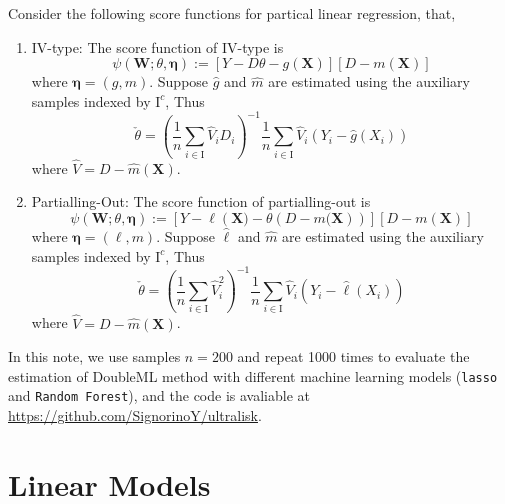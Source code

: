 \documentclass[en,12pt,mtpro2]{elegantpaper}
\begin{document}
Consider the following score functions for partical linear regression, that,
\begin{enumerate}
    \item IV-type: The score function of IV-type is
          \begin{equation}
              \psi\left(\mathbf{W};\theta,\boldsymbol{\eta}\right):=\left[Y-D\theta-g(\mathbf{X})\right]\left[D-m(\mathbf{X})\right]
          \end{equation}
          where $\boldsymbol{\eta}=(g,m)$. Suppose $\hat{g}$ and $\hat{m}$ are estimated using the auxiliary samples indexed by $\mathrm{I}^{c}$, Thus
          \begin{equation}
              \check{\theta}=\left(\frac{1}{n}\sum_{i\in\mathrm{I}}\widehat{V}_{i}D_{i}\right)^{-1}\frac{1}{n}\sum_{i\in\mathrm{I}}\hat{V}_{i}\left(Y_{i}-\hat{g}\left(X_{i}\right)\right)
          \end{equation}
          where $\hat{V}=D-\hat{m}(\mathbf{X})$.
    \item Partialling-Out: The score function of partialling-out is
          \begin{equation}
              \psi\left(\mathbf{W};\theta,\boldsymbol{\eta}\right):=\left[Y-\ell\left(\mathbf{X})-\theta\left(D-m(\mathbf{X}\right)\right)\right]\left[D-m(\mathbf{X})\right]
          \end{equation}
          where $\boldsymbol{\eta}=(\ell,m)$. Suppose $\hat{\ell}$ and $\hat{m}$ are estimated using the auxiliary samples indexed by $\mathrm{I}^{c}$, Thus
          \begin{equation}
              \check{\theta}=\left(\frac{1}{n}\sum_{i\in\mathrm{I}}\widehat{V}_{i}^{2}\right)^{-1}\frac{1}{n}\sum_{i\in\mathrm{I}}\hat{V}_{i}\left(Y_{i}-\hat{\ell}\left(X_{i}\right)\right)
          \end{equation}
          where $\hat{V}=D-\hat{m}(\mathbf{X})$.
\end{enumerate}

In this note, we use samples $n=200$ and repeat 1000 times to evaluate the estimation of DoubleML method with different machine learning models (\texttt{lasso} and \texttt{Random Forest}), and the code is avaliable at \href{https://github.com/SignorinoY/ultralisk}{https://github.com/SignorinoY/ultralisk}.
\clearpage

\section{Linear Models}
\end{document}
